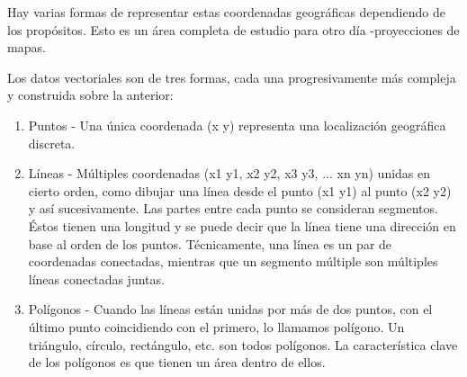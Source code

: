 Hay varias formas de representar estas coordenadas geográficas dependiendo de 
los propósitos. Esto es un área completa de estudio para otro día 
-proyecciones de mapas.

Los datos vectoriales son de tres formas, cada una progresivamente más compleja y
construida sobre la anterior:

\begin{enumerate}
\item Puntos - Una única coordenada (x y) representa una localización 
geográfica discreta.
\item Líneas - Múltiples coordenadas (x1 y1, x2 y2, x3 y3, ... xn yn) unidas 
en cierto orden, como dibujar una línea desde el punto (x1 y1) al punto (x2 y2)
y así sucesivamente. Las partes entre cada punto se consideran segmentos. 
Éstos tienen una longitud y se puede decir que la línea tiene una dirección
en base al orden de los puntos.
Técnicamente, una línea es un par de coordenadas conectadas, mientras que un 
segmento múltiple son múltiples líneas conectadas juntas.
\item Polígonos - Cuando las líneas están unidas por más de dos puntos, con el 
último punto coincidiendo con el primero, lo llamamos polígono.
Un triángulo, círculo, rectángulo, etc. son todos polígonos. La característica 
clave de los polígonos es que tienen un área dentro de ellos.
\end{enumerate}

